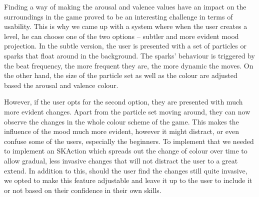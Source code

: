 Finding a way of making the arousal and valence values have an impact on the surroundings in the game proved to be an interesting challenge in terms of usability. This is why we came up with a system where when the user creates a level, he can choose one of the two options -- subtler and more evident mood projection. In the subtle version, the user is presented with a set of particles or sparks that float around in the background. The sparks' behaviour is triggered by the beat frequency, the more frequent they are, the more dynamic the moves. On the other hand, the size of the particle set as well as the colour are adjusted based the arousal and valence colour.

However, if the user opts for the second option, they are presented with much more evident changes. Apart from the particle set moving around, they can now observe the changes in the whole colour scheme of the game. This makes the influence of the mood much more evident, however it might distract, or even confuse some of the users, especially the beginners. To implement that we needed to implement an SKAction which spreads out the change of colour over time to allow gradual, less invasive changes that will not distract the user to a great extend. In addition to this, should the user find the changes still quite invasive, we opted to make this feature adjustable and leave it up to the user to include it or not based on their confidence in their own skills. 



